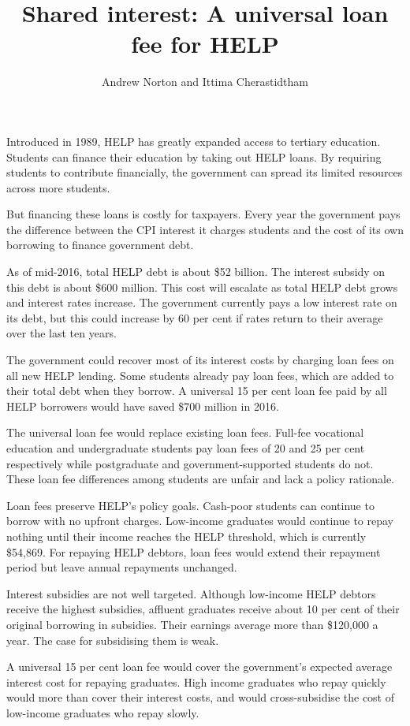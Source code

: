 \documentclass[embargoed]{grattan}
\title{Shared interest: A universal loan fee for HELP}
\author{Andrew Norton and Ittima Cherastidtham}
\begin{document}
\setlength{\overviewExtra}{-2pt}
\begin{overview}
Introduced in 1989, HELP has greatly expanded access to tertiary education.
Students can finance their education by taking out HELP loans.
By requiring students to contribute financially, the government can spread its limited resources across more students.

But financing these loans is costly for taxpayers.
Every year the government pays the difference between the \gls{CPI} interest it charges students and the cost of its own borrowing to finance government debt.

As of mid-2016, total HELP debt is about \$52 billion.
The interest subsidy on this debt is about \$600 million.
This cost will escalate as total HELP debt grows and interest rates increase.
The government currently pays a low interest rate on its debt, but this could increase by 60 per cent if rates return to their average over the last ten years.

The government could recover most of its interest costs by charging loan fees on all new HELP lending.
Some students already pay loan fees, which are added to their total debt when they borrow.
A universal 15 per cent loan fee paid by all HELP borrowers would have saved \$700 million in 2016.

The universal loan fee would replace existing loan fees.
Full-fee vocational education and undergraduate students pay loan fees of 20 and 25 per cent respectively while postgraduate and government-supported students do not.
These loan fee differences among students are unfair and lack a policy rationale.

Loan fees preserve HELP's policy goals.
Cash-poor students can continue to borrow with no upfront charges.
Low-income graduates would continue to repay nothing until their income reaches the HELP threshold, which is currently \$54,869.
For repaying HELP debtors, loan fees would extend their repayment period but leave annual repayments unchanged.

Interest subsidies are not well targeted.
Although low-income HELP debtors receive the highest subsidies, affluent graduates receive about 10 per cent of their original borrowing in subsidies.
Their earnings average more than \$120,000 a year.
The case for subsidising them is weak.

A universal 15 per cent loan fee would cover the government's expected average interest cost for repaying graduates.
High income graduates who repay quickly would more than cover their interest costs, and would cross-subsidise the cost of low-income graduates who repay slowly.


\end{overview}
\end{document}
